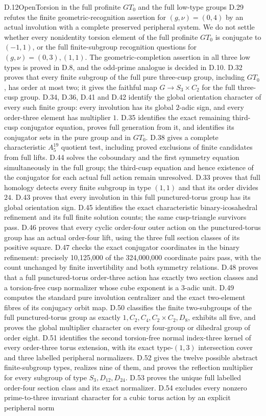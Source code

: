 \begin{claim}{D.12}{Open}{Torsion in the full profinite $GT_0$ and the full low-type groups}
D.29 refutes the finite geometric-recognition assertion for $(g,\nu)=(0,4)$ by an actual involution with a complete preserved peripheral system. We do not settle whether every nonidentity torsion element of the full profinite $GT_0$ is conjugate to $(-1,1)$, or the full finite-subgroup recognition questions for $(g,\nu)=(0,3),(1,1)$. The geometric-completion assertion in all three low types is proved in D.8, and the odd-prime analogue is decided in D.10. D.32 proves that every finite subgroup of the full pure three-cusp group, including $GT_0$, has order at most two; it gives the faithful map $G\to S_3\times C_2$ for the full three-cusp group. D.34, D.36, D.41 and D.42 identify the global orientation character of every such finite group: every involution has its global $2$-adic sign, and every order-three element has multiplier $1$. D.35 identifies the exact remaining third-cusp conjugator equation, proves full generation from it, and identifies its conjugator sets in the pure group and in $GT_0$. D.38 gives a complete characteristic $A_5^{19}$ quotient test, including proved exclusions of finite candidates from full lifts. D.44 solves the coboundary and the first symmetry equation simultaneously in the full group; the third-cusp equation and hence existence of the conjugator for each actual full action remain unresolved. D.33 proves that full homology detects every finite subgroup in type $(1,1)$ and that its order divides $24$. D.43 proves that every involution in this full punctured-torus group has its global orientation sign. D.45 identifies the exact characteristic binary-icosahedral refinement and its full finite solution counts; the same cusp-triangle survivors pass. D.46 proves that every cyclic order-four outer action on the punctured-torus group has an actual order-four lift, using the three full section classes of its positive square. D.47 checks the exact conjugator coordinates in the binary refinement: precisely 10,125,000 of the 324,000,000 coordinate pairs pass, with the count unchanged by finite invertibility and both symmetry relations. D.48 proves that a full punctured-torus order-three action has exactly two section classes and a torsion-free cusp normalizer whose cube exponent is a 3-adic unit. D.49 computes the standard pure involution centralizer and the exact two-element fibres of its conjugacy orbit map. D.50 classifies the finite two-subgroups of the full punctured-torus group as exactly $1,C_2,C_4,C_2\times C_2,D_8$, exhibits all five, and proves the global multiplier character on every four-group or dihedral group of order eight. D.51 identifies the second torsion-free normal index-three kernel of every order-three torus extension, with its exact type-$(1,3)$ intersection cover and three labelled peripheral normalizers. D.52 gives the twelve possible abstract finite-subgroup types, realizes nine of them, and proves the reflection multiplier for every subgroup of type $S_3,D_{12},D_{24}$. D.53 proves the unique full labelled order-four section class and its exact normalizer. D.54 excludes every nonzero prime-to-three invariant character for a cubic torus action by an explicit peripheral norm 
\end{claim}
